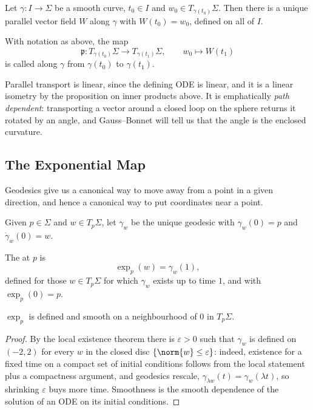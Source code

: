 \begin{proposition}
    Let $\gamma: I \rightarrow \Sigma$ be a smooth curve, $t_0 \in I$ and $w_0 \in T_{\gamma(t_0)}\Sigma$. Then there is a unique parallel vector field $W$ along $\gamma$ with $W(t_0) = w_0$, defined on all of $I$.
\end{proposition}

\begin{definition}
    With notation as above, the map
    $$
    \mathfrak{p}: T_{\gamma(t_0)}\Sigma \rightarrow T_{\gamma(t_1)}\Sigma, \qquad w_0 \mapsto W(t_1)
    $$
    is called  along $\gamma$ from $\gamma(t_0)$ to $\gamma(t_1)$.
\end{definition}

Parallel transport is linear, since the defining ODE is linear, and it is a linear isometry by the proposition on inner products above. It is emphatically \emph{path dependent}: transporting a vector around a closed loop on the sphere returns it rotated by an angle, and Gauss--Bonnet will tell us that the angle is the enclosed curvature.

\subsection{The Exponential Map}

Geodesics give us a canonical way to move away from a point in a given direction, and hence a canonical way to put coordinates near a point.

Given $p \in \Sigma$ and $w \in T_p\Sigma$, let $\gamma_w$ be the unique geodesic with $\gamma_w(0) = p$ and $\dot\gamma_w(0) = w$.

\begin{definition}
    The  at $p$ is
    $$
    \exp_p(w) = \gamma_w(1),
    $$
    defined for those $w \in T_p\Sigma$ for which $\gamma_w$ exists up to time $1$, and with $\exp_p(0) = p$.
\end{definition}

\begin{proposition}
    $\exp_p$ is defined and smooth on a neighbourhood of $0$ in $T_p\Sigma$.
\end{proposition}
\begin{proof}
    By the local existence theorem there is $\varepsilon > 0$ such that $\gamma_w$ is defined on $(-2, 2)$ for every $w$ in the closed disc $\{\norm{w} \leq \varepsilon\}$: indeed, existence for a fixed time on a compact set of initial conditions follows from the local statement plus a compactness argument, and geodesics rescale, $\gamma_{\lambda w}(t) = \gamma_w(\lambda t)$, so shrinking $\varepsilon$ buys more time. Smoothness is the smooth dependence of the solution of an ODE on its initial conditions.
\end{proof}


